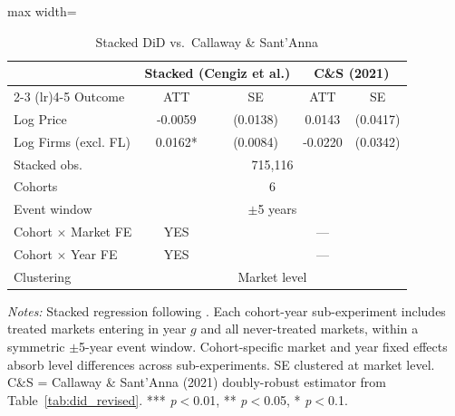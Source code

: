 \begin{table}[htbp]
\centering
\caption{Stacked DiD vs.\ Callaway \& Sant'Anna}
\label{tab:stacked_did}
\begin{adjustbox}{max width=\textwidth}
\begin{threeparttable}
\small
\begin{tabular}{lcccc}
\toprule
 & \multicolumn{2}{c}{Stacked (Cengiz et al.)} & \multicolumn{2}{c}{C\&S (2021)} \\
\cmidrule(lr){2-3} \cmidrule(lr){4-5}
Outcome & ATT & SE & ATT & SE \\
\midrule
Log Price & -0.0059 & (0.0138) & 0.0143 & (0.0417) \\
Log Firms (excl. FL) & 0.0162* & (0.0084) & -0.0220 & (0.0342) \\
\midrule
Stacked obs. & \multicolumn{4}{c}{715,116} \\
Cohorts & \multicolumn{4}{c}{6} \\
Event window & \multicolumn{4}{c}{$\pm$5 years} \\
Cohort $\times$ Market FE & YES & & --- & \\
Cohort $\times$ Year FE & YES & & --- & \\
Clustering & \multicolumn{4}{c}{Market level} \\
\bottomrule
\end{tabular}
\begin{tablenotes}
\small
\item \textit{Notes:} Stacked regression following \citet{cengiz2019effect}.
Each cohort-year sub-experiment includes treated markets entering in year $g$
and all never-treated markets, within a symmetric $\pm$5-year event window.
Cohort-specific market and year fixed effects absorb level differences across
sub-experiments. SE clustered at market level.
C\&S = Callaway \& Sant'Anna (2021) doubly-robust estimator from Table~\ref{tab:did_revised}.
*** \textit{p}$<$0.01, ** \textit{p}$<$0.05, * \textit{p}$<$0.1.
\end{tablenotes}
\end{threeparttable}
\end{adjustbox}
\end{table}
